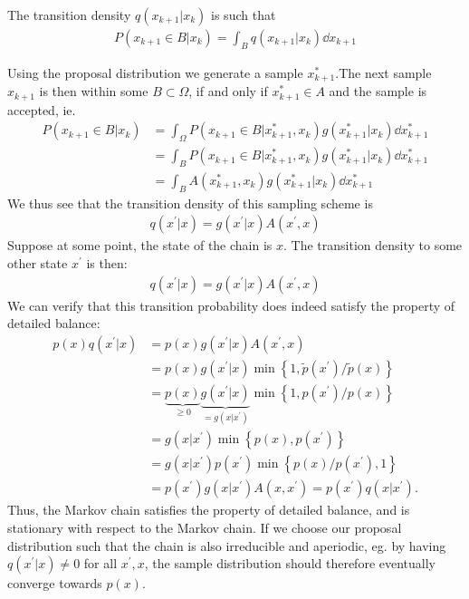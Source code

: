 The transition density $q(x_{k+1}|x_k)$ is such that 
\begin{align}
    P(x_{k+1} \in B | x_k ) = \int_B q (x_{k+1}|x_k )\dd x_{k+1}
\end{align}

Using the proposal distribution we generate a sample $x^\ast_{k+1}$.The next sample $x_{k+1}$ is then within some $B\subset \Omega$, if and only if $x^\ast_{k+1}\in A$ and the sample is accepted, ie.
\begin{equation}
    \begin{aligned}
        P(x_{k+1} \in B | x_k ) 
        &= \int_\Omega P( x_{k+1} \in B | x^\ast_{k+1},x_k) g(x^\ast_{k+1}|x_k) \dd{x^\ast_{k+1}}\\
        &= \int_B P( x_{k+1} \in B | x^\ast_{k+1},x_k) g(x^\ast_{k+1}|x_k) \dd{x^\ast_{k+1}} \\
        &= \int_B A(x^\ast_{k+1}, x_k) g(x^\ast_{k+1}|x_k) \dd{x^\ast_{k+1}}
    \end{aligned}
\end{equation}
We thus see that the transition density of this sampling scheme is
\begin{align}
    q(x^\prime|x) = g(x^\prime | x) A(x^\prime, x)
\end{align} 
Suppose at some point, the state of the chain is $x$.
The transition density to some other state $x^\prime$ is then:
\begin{align*}
    q(x^\prime|x) = g(x^\prime | x) A(x^\prime, x)
\end{align*}
We can verify that this transition probability does indeed satisfy the property of detailed balance:
\begin{align*}
    p(x)q(x^\prime|x) &= p(x)g(x^\prime | x) A(x^\prime, x) \\
    &= p(x)g(x^\prime | x) \min\left\{1,  \tilde{p}(x^\prime) / \tilde{p}(x)\right\} \\
    &= \underbrace{p(x)}_{\geq 0} \underbrace{g(x^\prime | x)}_{=g(x | x^\prime)} \min\left\{1,  p(x^\prime) / p(x)\right\} \\
    &= g(x | x^\prime) \min\left\{p(x), p(x^\prime)\right\} \\
    &= g(x | x^\prime) p(x^\prime) \min\left\{p(x)/p(x^\prime), 1\right\} \\
    &= p(x^\prime) g(x | x^\prime)  A(x ,x^\prime) = p(x^\prime) q(x|x^\prime).
\end{align*}
Thus, the Markov chain satisfies the property of detailed balance, and is stationary with respect to the Markov chain.
If we choose our proposal distribution such that the chain is also irreducible and aperiodic, eg. by having $q(x^\prime|x) \neq 0$ for all $x^\prime,x$, the sample distribution should therefore eventually converge towards $p(x)$. 

